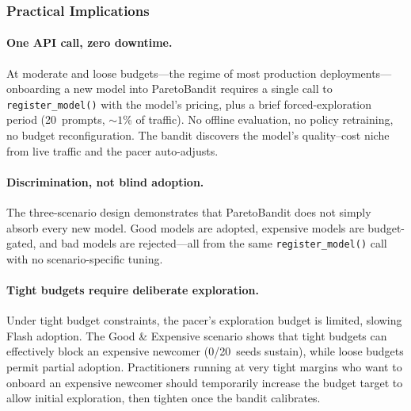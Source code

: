 \subsubsection{Practical Implications}

\paragraph{One API call, zero downtime.}
At moderate and loose budgets---the regime of most production
deployments---onboarding a new model into ParetoBandit requires a
single call to \texttt{register\_model()} with the model's pricing,
plus a brief forced-exploration period (20~prompts, ${\sim}1$\% of
traffic).
No offline evaluation, no policy retraining, no budget
reconfiguration.  The bandit discovers the model's quality--cost
niche from live traffic and the pacer auto-adjusts.

\paragraph{Discrimination, not blind adoption.}
The three-scenario design demonstrates that ParetoBandit does not
simply absorb every new model.
Good models are adopted, expensive models are budget-gated, and bad
models are rejected---all from the same \texttt{register\_model()}
call with no scenario-specific tuning.

\paragraph{Tight budgets require deliberate exploration.}
Under tight budget constraints, the pacer's exploration budget is
limited, slowing Flash adoption.
The Good \& Expensive scenario shows that tight budgets
can effectively block an expensive newcomer (0/20~seeds sustain),
while loose budgets permit partial adoption.
Practitioners running at very tight margins who want to onboard an
expensive newcomer should temporarily increase the budget target to
allow initial exploration, then tighten once the bandit calibrates.
